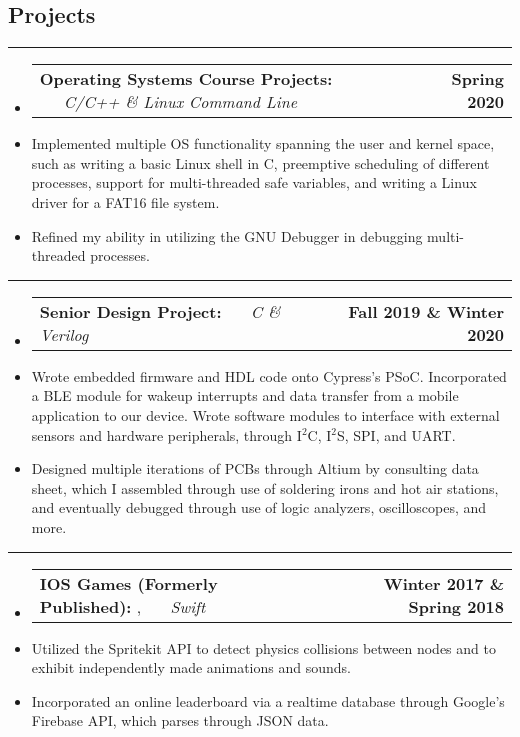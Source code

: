 \documentclass[10pt,letterpaper]{article}
\makeatletter
\newcommand{\items}[2]
{
	\begin{tabular*}{\linewidth}{l @{\extracolsep{\fill}} r}
		#1 & #2 \\
	\end{tabular*}
}
\newcommand{\sectionbreak}
{
	\vspace{-1.2em}
	\rule{\textwidth}{1.7pt}
	\vspace{-1.7em}
}
\makeatother
\begin{document}
\vspace{-1.5em}

\subsection*{Projects}
\sectionbreak

\begin{itemize}
	\item[]
		\items
			{\textbf{Operating Systems Course Projects:} \ \ \ \footnotesize  \emph{C/C++ \& Linux Command Line} }
			{\textbf{Spring 2020}}
		\item
			Implemented multiple OS functionality spanning the user and kernel space, such as writing a basic Linux shell in C, preemptive scheduling of different processes, support for multi-threaded safe variables, and writing a Linux driver for a FAT16 file system.
		\item 
			Refined my ability in utilizing the GNU Debugger in debugging multi-threaded processes.
\end{itemize}

\hrule 

\begin{itemize}
	\item[]
		\items 
		{
			\textbf{Senior Design Project: }
			\emph{\smash{Smart Dog Collar}} \ \ \ \footnotesize \emph{C \& Verilog}
		}
			{\textbf{Fall 2019 \& Winter 2020}}
		\item 
			Wrote embedded firmware and HDL code onto Cypress's PSoC. Incorporated a BLE module for wakeup interrupts and data transfer from a mobile application to our device. Wrote software modules to interface with external sensors and hardware peripherals, through I$^{2}$C, I$^{2}$S, SPI, and UART. 
		\item
			Designed multiple iterations of PCBs through Altium by consulting data sheet, which I assembled through use of soldering irons and hot air stations, and eventually debugged through use of logic analyzers, oscilloscopes, and more.

\end{itemize}

\hrule

\begin{itemize}
	\item[]
		\items 
		{
			\textbf{IOS Games (Formerly Published): }
			\href{https://appadvice.com/app/round-bound/1369632746}{\emph{\underline{\smash{Round 'a Bound}}}}, 
			\href{https://appadvice.com/app/tic-tac-emoji/1346934986}{\emph{\underline{\smash{Tic-Tac Emoji}}}} \ \ \ \footnotesize  \emph{Swift}
		}
			{\textbf{Winter 2017 \& Spring 2018}}
		\item 
			Utilized the Spritekit API to detect physics collisions between nodes and to exhibit independently made animations and sounds.
		\item
			Incorporated an online leaderboard via a realtime database through Google's Firebase API, which parses through JSON data. 
\end{itemize}
\end{document}
